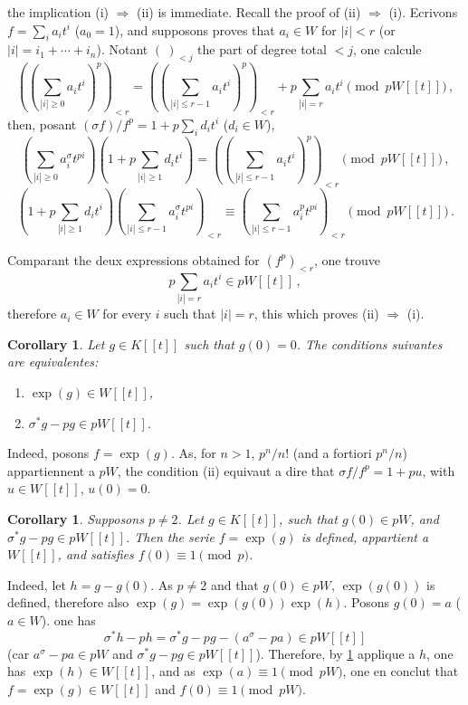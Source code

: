 \documentclass[12pt,a4paper]{article}
\theoremstyle{plain}
\newtheorem{corollary}[theorem]{Corollary}
\theoremstyle{definition}
\theoremstyle{remark}
\begin{document}
the implication (i) $\Rightarrow$ (ii) is immediate. Recall the proof of (ii) $\Rightarrow$ (i). Ecrivons $f = \sum_i a_it^i$ ($a_0 = 1$), and supposons proves that $a_i \in W$ for $|i| < r$ (or $|i| = i_1 + \cdots + i_n$). Notant $(\ )_{<j}$ the part of degree total $< j$, one calcule
\[
((\sum_{|i| \geq 0} a_it^i)^p)_{<r} = ((\sum_{|i| \leq r-1} a_it^i)^p)_{<r} + p\sum_{|i|=r} a_it^i \pmod{pW[[t]]}\,,
\]
then, posant $(\sigma f)/f^p = 1 + p\sum_i d_it^i$ ($d_i \in W$),
\[
(\sum_{|i| \geq 0} a_i^\sigma t^{pi})(1 + p\sum_{|i| \geq 1} d_it^i) = ((\sum_{|i| \leq r-1} a_it^i)^p)_{<r} \pmod{pW[[t]]}\,,
\]
\[
(1 + p\sum_{|i| \geq 1} d_it^i)(\sum_{|i| \leq r-1} a_i^\sigma t^{pi})_{<r} \equiv (\sum_{|i| \leq r-1} a_i^pt^{pi})_{<r} \pmod{pW[[t]]}\,.\]

Comparant the deux expressions obtained for $(f^p)_{<r}$, one trouve
\[
p\sum_{|i|=r} a_it^i \in pW[[t]]\,,
\]
therefore $a_i \in W$ for every $i$ such that $|i| = r$, this which proves (ii) $\Rightarrow$ (i).

\begin{corollary}\label{cor:1.4.4}
Let $g \in K[[t]]$ such that $g(0) = 0$. The conditions suivantes are equivalentes:
\begin{enumerate}[label=(\roman*)]
\item $\exp(g) \in W[[t]]$,
\item $\sigma^*g - pg \in pW[[t]]$.
\end{enumerate}
\end{corollary}

Indeed, posons $f = \exp(g)$. As, for $n > 1$, $p^n/n!$ (and a fortiori $p^n/n$) appartiennent a $pW$, the condition (ii) equivaut a dire that $\sigma f/f^p = 1 + pu$, with $u \in W[[t]]$, $u(0) = 0$.

\begin{corollary}\label{cor:1.4.5}
Supposons $p \neq 2$. Let $g \in K[[t]]$, such that $g(0) \in pW$, and $\sigma^*g - pg \in pW[[t]]$. Then the serie $f = \exp(g)$ is defined, appartient a $W[[t]]$, and satisfies $f(0) \equiv 1 \pmod{p}$.
\end{corollary}

Indeed, let $h = g - g(0)$. As $p \neq 2$ and that $g(0) \in pW$, $\exp(g(0))$ is defined, therefore also $\exp(g) = \exp(g(0))\exp(h)$. Posons $g(0) = a$ ($a \in W$). one has
\[
\sigma^*h - ph = \sigma^*g - pg - (a^\sigma - pa) \in pW[[t]]
\]
(car $a^\sigma - pa \in pW$ and $\sigma^*g - pg \in pW[[t]]$). Therefore, by \ref{cor:1.4.4} applique a $h$, one has $\exp(h) \in W[[t]]$, and as $\exp(a) \equiv 1 \pmod{pW}$, one en conclut that $f = \exp(g) \in W[[t]]$ and $f(0) \equiv 1 \pmod{pW}$.
\end{document}
